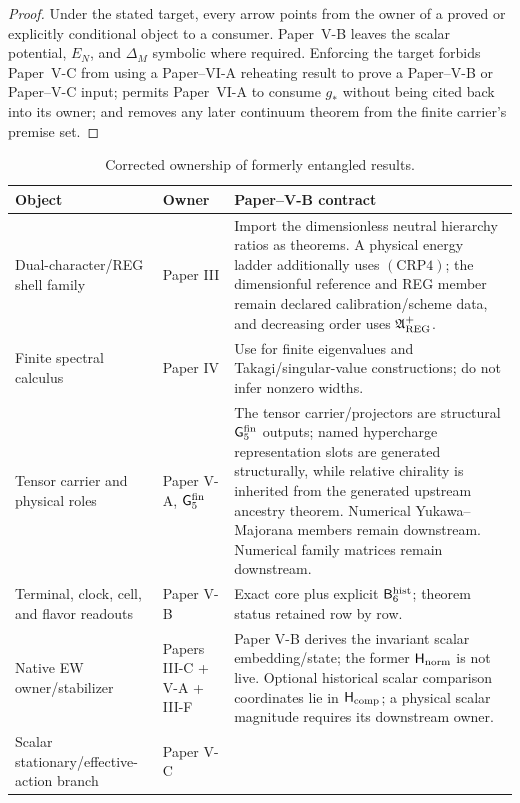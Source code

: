 \documentclass[12pt,a4paper]{article}
\newcommand{\BridgeRaw}{\mathsf B_6^{\rm hist}}
\newcommand{\Gfive}{\mathsf G_5^{\rm fin}}
\begin{document}
\begin{proof}
Under the stated target, every arrow points from the owner of a proved or
explicitly conditional object to a consumer.  Paper~V-B leaves the scalar
potential, \(E_N\), and \(\Delta_M\) symbolic where required.  Enforcing the
target forbids Paper~V-C from using a Paper--VI-A reheating result to prove a
Paper--V-B or Paper--V-C input; permits Paper~VI-A to consume \(g_*\) without
being cited back into its owner; and removes any later continuum theorem from
the finite carrier's premise set.
\end{proof}

\begin{table}[H]
\centering
\caption{Corrected ownership of formerly entangled results.}
\label{p6:tab:ownership}
\footnotesize
{}
\renewcommand{\arraystretch}{1.12}
\begin{tabularx}{\textwidth}{@{}L{0.27\textwidth}L{0.22\textwidth}Y@{}}
\toprule
Object & Owner & Paper--V-B contract \\
\midrule
Dual-character/REG shell family & Paper III &
Import the dimensionless neutral hierarchy ratios as theorems.  A physical
energy ladder additionally uses \((\mathrm{CRP4})\); the dimensionful
reference and REG member remain declared calibration/scheme data, and
decreasing order uses \(\mathfrak A_{\rm REG}^{+}\).\\
Finite spectral calculus & Paper IV &
Use for finite eigenvalues and Takagi/singular-value constructions; do not
infer nonzero widths.\\
Tensor carrier and physical roles & Paper V-A, \(\Gfive\) &
The tensor carrier/projectors are structural \(\Gfive\) outputs; named
hypercharge representation slots are generated structurally, while relative chirality is inherited from the generated upstream ancestry theorem.  Numerical Yukawa--Majorana members remain downstream.  Numerical
family matrices remain downstream.\\
Terminal, clock, cell, and flavor readouts & Paper V-B &
Exact core plus explicit \(\BridgeRaw\); theorem status retained row by row.\\
Native EW owner/stabilizer & Papers III-C + V-A + III-F &
Paper V-B derives the invariant scalar embedding/state; the former
\(\mathsf H_{\rm norm}\) is not live. Optional historical scalar comparison
coordinates lie in \(\mathsf H_{\rm comp}\); a physical scalar magnitude
requires its downstream owner.\\
Scalar stationary/effective-action branch & Paper V-C &

\end{tabularx}
\end{table}
\end{document}

